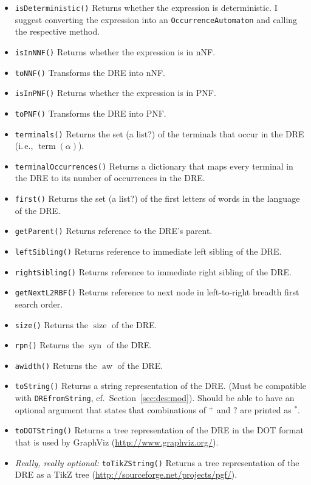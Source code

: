 \documentclass[a4paper,11pt, svgnames,titlepage]{article}
\newcommand{\rxp}{{^\mathtt{+}}}
\newcommand{\rxs}{{^\mathtt{*}}}
\newcommand{\rxo}{\mathtt{?}}
\DeclareMathOperator{\siz}{size}
\DeclareMathOperator{\syn}{syn}
\DeclareMathOperator{\aw}{aw}
\DeclareMathOperator{\term}{term}
\begin{document}
\begin{itemize}
	\item\texttt{isDeterministic()} Returns whether the expression is deterministic. I suggest converting the expression into an \texttt{OccurrenceAutomaton} and calling the respective method.
	\item\texttt{isInNNF()} Returns whether the expression is in nNF.
	\item\texttt{toNNF()} Transforms the DRE into nNF.
	\item\texttt{isInPNF()} Returns whether the expression is in PNF.
	\item\texttt{toPNF()} Transforms the DRE into PNF.
	\item\texttt{terminals()} Returns the set (a list?) of the terminals that occur in the DRE (i.\,e., $\term(\alpha)$).
	\item\texttt{terminalOccurrences()} Returns a dictionary that maps every terminal in the DRE to its number of occurrences in the DRE.
	\item\texttt{first()} Returns the set (a list?) of the first letters of words in the language of the DRE.
	\item\texttt{getParent()} Returns reference to the DRE's parent.
	\item\texttt{leftSibling()} Returns reference to immediate left sibling of the DRE.
	\item\texttt{rightSibling()} Returns reference to immediate right sibling of the DRE.
	\item\texttt{getNextL2RBF()} Returns reference to next node in left-to-right breadth first search order.
	\item\texttt{size()} Returns the $\siz$ of the DRE.
	\item\texttt{rpn()} Returns the $\syn$ of the DRE.
	\item\texttt{awidth()} Returns the $\aw$ of the DRE.
	\item\texttt{toString()} Returns a string representation of the DRE. (Must be compatible with \texttt{DREfromString}, cf.\ Section~\ref{sec:des:mod}). Should be able to have an optional argument that states that combinations of $\rxp$ and $\rxo$ are printed as $\rxs$.
	\item\texttt{toDOTString()} Returns a tree representation of the DRE in the DOT format that is used by GraphViz (\url{http://www.graphviz.org/}).
	\item \emph{Really, really optional:} \texttt{toTikZString()} Returns a tree representation of the DRE as a TikZ tree (\url{http://sourceforge.net/projects/pgf/}).
\end{itemize}
\end{document}
